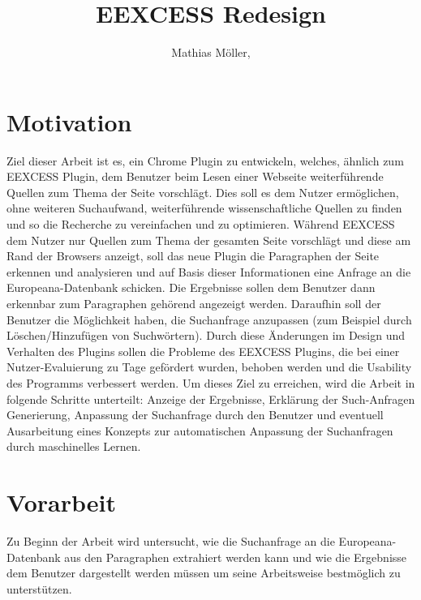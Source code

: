 \documentclass{llncs}
\begin{document}
%
%
\pagestyle{headings}  %
%
%
\title{EEXCESS Redesign} 
%
\author{Mathias Möller,\\
}
%

\maketitle              %

\pagestyle{plain}		%


%
%
\section{Motivation} 
\label{sec:motivation}
Ziel dieser Arbeit ist es, ein Chrome Plugin zu entwickeln, welches, ähnlich zum EEXCESS Plugin, dem Benutzer beim Lesen einer Webseite weiterführende Quellen zum Thema der Seite vorschlägt. Dies soll es dem Nutzer ermöglichen, ohne weiteren Suchaufwand, weiterführende wissenschaftliche Quellen zu finden und so die Recherche zu vereinfachen und zu optimieren.
\newline
Während EEXCESS dem Nutzer nur Quellen zum Thema der gesamten Seite vorschlägt und diese am Rand der Browsers anzeigt, soll das neue Plugin die Paragraphen der Seite erkennen und analysieren und auf Basis dieser Informationen eine Anfrage an die Europeana-Datenbank schicken. Die Ergebnisse sollen dem Benutzer dann erkennbar zum Paragraphen gehörend angezeigt werden. Daraufhin soll der Benutzer die Möglichkeit haben, die Suchanfrage anzupassen (zum Beispiel durch Löschen/Hinzufügen von Suchwörtern).
\newline
Durch diese Änderungen im Design und Verhalten des Plugins sollen die Probleme des EEXCESS Plugins, die bei einer Nutzer-Evaluierung zu Tage gefördert wurden, behoben werden und die Usability des Programms verbessert werden.
\newline
Um dieses Ziel zu erreichen, wird die Arbeit in folgende Schritte unterteilt: Anzeige der Ergebnisse, Erklärung der Such-Anfragen Generierung, Anpassung der Suchanfrage durch den Benutzer und eventuell Ausarbeitung eines Konzepts zur automatischen Anpassung der Suchanfragen durch maschinelles Lernen.

\section{Vorarbeit}
Zu Beginn der Arbeit wird untersucht, wie die Suchanfrage an die Europeana-Datenbank aus den Paragraphen extrahiert werden kann und wie die Ergebnisse dem Benutzer dargestellt werden müssen um seine Arbeitsweise bestmöglich zu unterstützen.
\newpage
\end{document}
